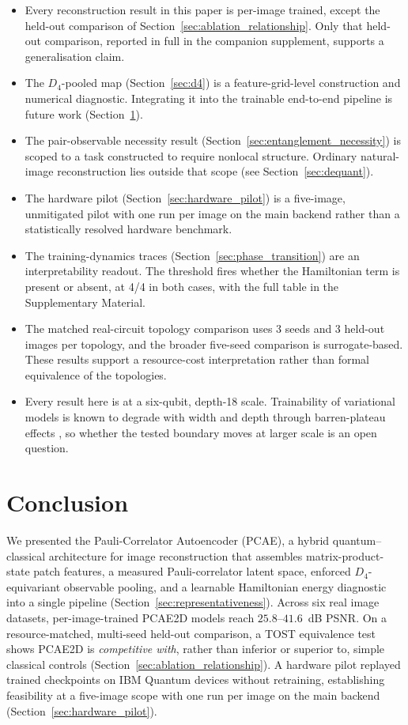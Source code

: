 \documentclass[pdflatex,sn-basic]{sn-jnl}
\begin{document}
\begin{itemize}\itemsep4pt
\item Every reconstruction result in this paper is per-image trained, except the held-out comparison of Section~\ref{sec:ablation_relationship}. Only that held-out comparison, reported in full in the companion supplement, supports a generalisation claim.
\item The $D_4$-pooled map (Section~\ref{sec:d4}) is a feature-grid-level construction and numerical diagnostic. Integrating it into the trainable end-to-end pipeline is future work (Section~\ref{sec:conclusion}).
\item The pair-observable necessity result (Section~\ref{sec:entanglement_necessity}) is scoped to a task constructed to require nonlocal structure. Ordinary natural-image reconstruction lies outside that scope (see Section~\ref{sec:dequant}).
\item The hardware pilot (Section~\ref{sec:hardware_pilot}) is a five-image, unmitigated pilot with one run per image on the main backend rather than a statistically resolved hardware benchmark.
\item The training-dynamics traces (Section~\ref{sec:phase_transition}) are an interpretability readout. The threshold fires whether the Hamiltonian term is present or absent, at 4/4 in both cases, with the full table in the Supplementary Material.
\item The matched real-circuit topology comparison uses 3 seeds and 3 held-out images per topology, and the broader five-seed comparison is surrogate-based. These results support a resource-cost interpretation rather than formal equivalence of the topologies.
\item Every result here is at a six-qubit, depth-18 scale. Trainability of variational models is known to degrade with width and depth through barren-plateau effects \citep{McClean2018, Larocca2025}, so whether the tested boundary moves at larger scale is an open question.
\end{itemize}

\section{Conclusion}
\label{sec:conclusion}

We presented the Pauli-Correlator Autoencoder (PCAE), a hybrid quantum--classical
architecture for image reconstruction that assembles matrix-product-state patch
features, a measured Pauli-correlator latent space, enforced $D_4$-equivariant
observable pooling, and a learnable Hamiltonian energy diagnostic into a single
pipeline (Section~\ref{sec:representativeness}). Across six real image datasets,
per-image-trained PCAE2D models
reach $25.8$--$41.6$~dB PSNR. On a
resource-matched, multi-seed held-out comparison, a TOST equivalence
test shows PCAE2D is \emph{competitive with}, rather than inferior or superior to,
simple classical controls (Section~\ref{sec:ablation_relationship}). A hardware
pilot replayed trained checkpoints on IBM Quantum devices without retraining,
establishing feasibility at a five-image scope with one run per image on the main backend
(Section~\ref{sec:hardware_pilot}).
\end{document}
